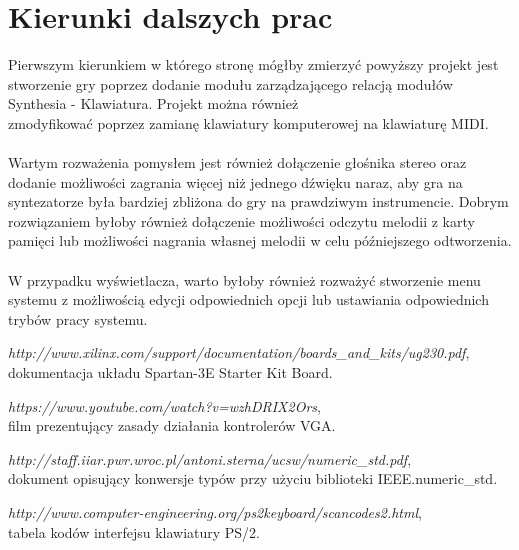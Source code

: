 \documentclass[a4paper]{report}
\begin{document}
	\section{Kierunki dalszych prac}
	Pierwszym kierunkiem w którego stronę mógłby zmierzyć powyższy projekt jest stworzenie gry poprzez dodanie modułu zarządzającego relacją modułów Synthesia - Klawiatura. Projekt można również \\zmodyfikować poprzez zamianę klawiatury komputerowej na klawiaturę MIDI. \\\\Wartym rozważenia pomysłem jest również dołączenie głośnika stereo oraz dodanie możliwości zagrania więcej niż jednego dźwięku naraz, aby gra na syntezatorze była bardziej zbliżona do gry na prawdziwym instrumencie. Dobrym rozwiązaniem byłoby również dołączenie możliwości odczytu melodii z karty pamięci lub możliwości nagrania własnej melodii w celu późniejszego odtworzenia.\\\\W przypadku wyświetlacza, warto byłoby również rozważyć stworzenie menu systemu z możliwością edycji odpowiednich opcji lub ustawiania odpowiednich trybów pracy systemu.
	
\begin{thebibliography}{999}
		{\em http://www.xilinx.com/support/documentation/boards\_and\_kits/ug230.pdf}, \\
		dokumentacja układu Spartan-3E Starter Kit Board.
	
		{\em https://www.youtube.com/watch?v=wzhDRIX2Ors}, \\
		film prezentujący zasady działania kontrolerów VGA.
		
		{\em http://staff.iiar.pwr.wroc.pl/antoni.sterna/ucsw/numeric\_std.pdf}, \\
		dokument opisujący konwersje typów przy użyciu biblioteki IEEE.numeric\_std.
		
		{\em http://www.computer-engineering.org/ps2keyboard/scancodes2.html}, \\
		tabela kodów interfejsu klawiatury PS/2.
		
	\end{thebibliography}	

\begin{appendix}
	\listoffigures
\end{appendix}
\end{document}
